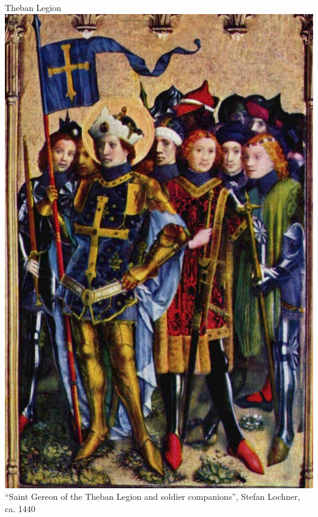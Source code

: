 \begin{frame}{Theban Legion}
    \centering
    \includegraphics[height=0.7\textheight]{img/theban-3-clip.png} \\
    ``Saint Gereon of the Theban Legion and soldier companions'', Stefan Lochner, ca. 1440 \\
\end{frame}


